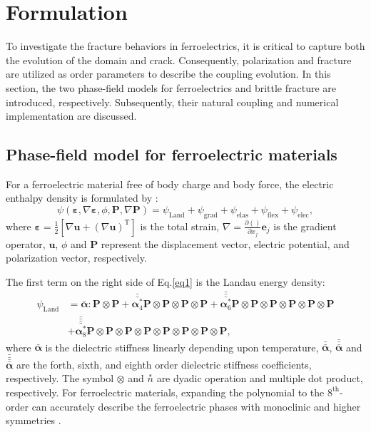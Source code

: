 \section{Formulation}\label{Section2}
To investigate the fracture behaviors in ferroelectrics, it is critical to capture both the evolution of the domain and crack. Consequently, polarization and fracture are utilized as order parameters to describe the coupling evolution.  In this section, the two phase-field models for ferroelectrics and brittle fracture are introduced, respectively. Subsequently, their natural coupling and numerical implementation are discussed.

\subsection{Phase-field model for ferroelectric materials}
For a ferroelectric material free of body charge and body force, the electric enthalpy density is formulated by \cite{gu_flexoelectricity_2014,jiang_polarization_2015}:
\begin{equation}\label{eq1}
    \psi(\mathbf{\varepsilon},\nabla\mathbf{\varepsilon},\phi,\mathbf{P},\nabla\mathbf{P})
    =\psi_\mathrm{Land}+\psi_\mathrm{grad}+\psi_\mathrm{elas}+\psi_\mathrm{flex}+\psi_\mathrm{elec},
\end{equation}
where $\mathbf{\varepsilon}=\frac{1}{2}\left[\nabla \mathbf{u}+(\nabla\mathbf{u})^\mathrm{T}\right]$ is the total strain, $\nabla=\frac{\partial ()}{\partial x_j}\mathbf{e}_j $ is the gradient operator, $\mathbf{u}$, $\phi$ and $\mathbf{P}$ represent the displacement vector, electric potential, and polarization vector, respectively.

The first term on the right side of Eq.\eqref{eq1} is the Landau energy density:
\begin{equation}
   \begin{split}
     \psi_\mathrm{Land}&=\bar{\mathbf{\alpha}}:\mathbf{P}\otimes\mathbf{P}+\bar{\bar{\mathbf{\alpha}^*_4}} \mathbf{P}\otimes\mathbf{P}\otimes\mathbf{P}\otimes\mathbf{P}+\bar{\bar{\bar{\mathbf{\alpha}^*_6}}}\mathbf{P}\otimes\mathbf{P}\otimes\mathbf{P}\otimes\mathbf{P}\otimes\mathbf{P}\otimes\mathbf{P}\\
    &+\bar{\bar{\bar{\bar{\mathbf{\alpha}^*_8}}}} \mathbf{P}\otimes\mathbf{P}\otimes\mathbf{P}\otimes\mathbf{P}\otimes\mathbf{P}\otimes\mathbf{P}\otimes\mathbf{P}\otimes\mathbf{P},
   \end{split}
\end{equation}
where $\bar{\mathbf{\alpha}}$ is the dielectric stiffness linearly depending upon temperature, $\bar{\bar{\mathbf{\alpha}}}$, $\bar{\bar{\bar{\mathbf{\alpha}}}}$ and $\bar{\bar{\bar{\bar{\mathbf{\alpha}}}}}$ are the forth, sixth, and eighth order dielectric stiffness coefficients, respectively. The symbol $\otimes$ and  $\overset{*}{n}$ are dyadic operation and multiple dot product, respectively. For ferroelectric materials, expanding the polynomial to the $8^\mathrm{th}$-order can accurately describe the ferroelectric phases with monoclinic and higher symmetries \cite{heitmann_thermodynamics_2014}.

